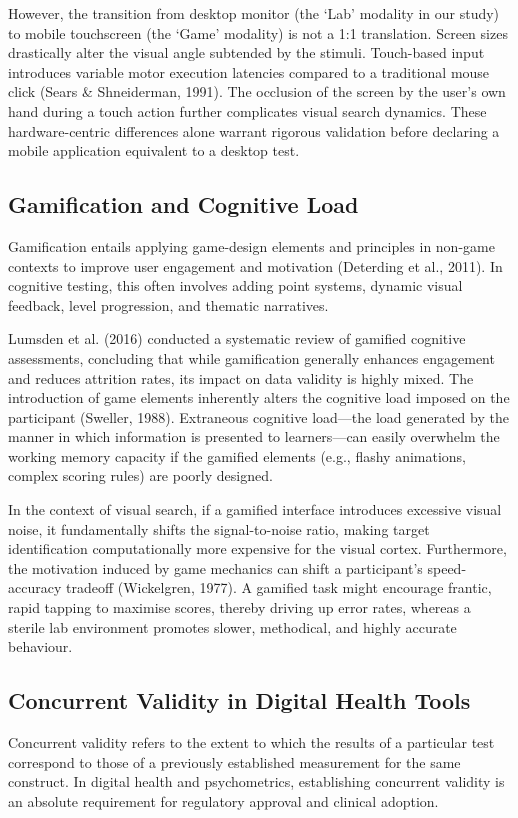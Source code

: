 \documentclass[11pt,a4paper]{article}
\begin{document}
However, the transition from desktop monitor (the `Lab' modality in our study) to mobile touchscreen (the `Game' modality) is not a 1:1 translation. Screen sizes drastically alter the visual angle subtended by the stimuli. Touch-based input introduces variable motor execution latencies compared to a traditional mouse click (Sears \& Shneiderman, 1991). The occlusion of the screen by the user's own hand during a touch action further complicates visual search dynamics. These hardware-centric differences alone warrant rigorous validation before declaring a mobile application equivalent to a desktop test.

\subsection{Gamification and Cognitive Load}
Gamification entails applying game-design elements and principles in non-game contexts to improve user engagement and motivation (Deterding et al., 2011). In cognitive testing, this often involves adding point systems, dynamic visual feedback, level progression, and thematic narratives.

Lumsden et al. (2016) conducted a systematic review of gamified cognitive assessments, concluding that while gamification generally enhances engagement and reduces attrition rates, its impact on data validity is highly mixed. The introduction of game elements inherently alters the cognitive load imposed on the participant (Sweller, 1988). Extraneous cognitive load—the load generated by the manner in which information is presented to learners—can easily overwhelm the working memory capacity if the gamified elements (e.g., flashy animations, complex scoring rules) are poorly designed.

In the context of visual search, if a gamified interface introduces excessive visual noise, it fundamentally shifts the signal-to-noise ratio, making target identification computationally more expensive for the visual cortex. Furthermore, the motivation induced by game mechanics can shift a participant's speed-accuracy tradeoff (Wickelgren, 1977). A gamified task might encourage frantic, rapid tapping to maximise scores, thereby driving up error rates, whereas a sterile lab environment promotes slower, methodical, and highly accurate behaviour.

\subsection{Concurrent Validity in Digital Health Tools}
Concurrent validity refers to the extent to which the results of a particular test correspond to those of a previously established measurement for the same construct. In digital health and psychometrics, establishing concurrent validity is an absolute requirement for regulatory approval and clinical adoption.
\end{document}
